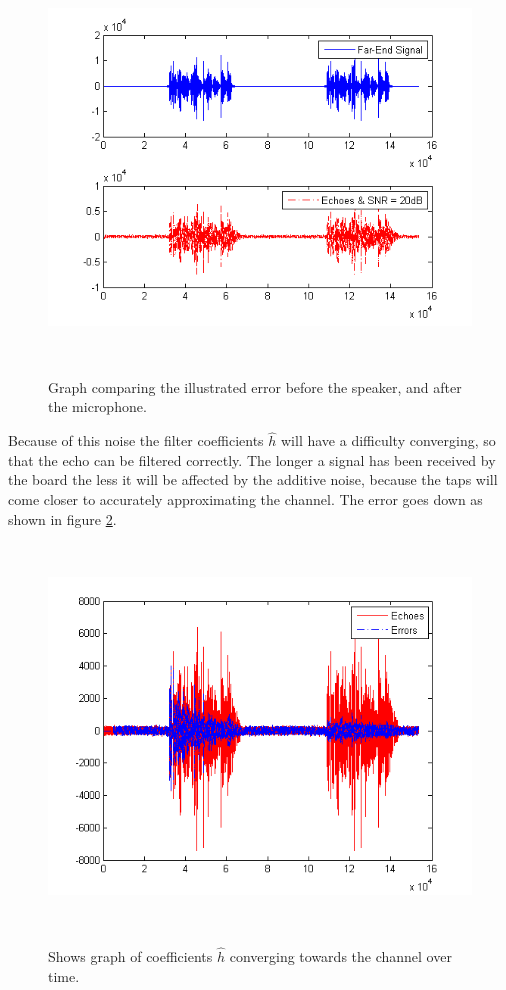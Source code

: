 \documentclass[a4paper,11pt,twoside]{article}
\begin{document}
\begin{figure} \
  \centering

	\includegraphics[width=1\textwidth]{Echoes.png}
  	\caption{Graph comparing the illustrated error before the speaker, and after the microphone.}
  	  \label{fig:echoes}
\ \end{figure}

Because of this noise the filter coefficients $\hat{h}$ will have a difficulty converging, so that the echo can be filtered correctly. The longer a signal has been received by the board the less it will be affected by the additive noise, because the taps will come closer to accurately approximating the channel. The error goes down as shown in figure \ref{fig:errors}.

\begin{figure} \label{fig:errors}\
  \centering
 
	\includegraphics[width=1\textwidth]{Errors.png}
  	\caption{Shows graph of  coefficients $\hat{h}$ converging towards the channel over time.}
\ \end{figure}
\end{document}
